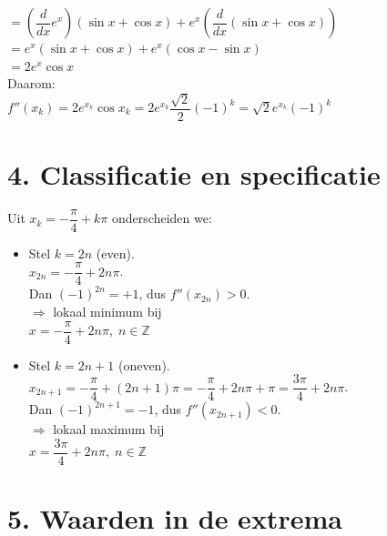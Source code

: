\documentclass[a4paper]{article}
\begin{document}
$=\left(\dfrac{d}{dx}e^x\right)(\sin x+\cos x)
+ e^x\left(\dfrac{d}{dx}(\sin x+\cos x)\right)$ \\

$=e^x(\sin x+\cos x) + e^x(\cos x-\sin x)$ \\

$=2e^x\cos x$ \\

Daarom: \\

$f''(x_k)=2e^{x_k}\cos x_k
=2e^{x_k}\dfrac{\sqrt{2}}{2}(-1)^k
=\sqrt{2}e^{x_k}(-1)^k$ \\

\section*{4. Classificatie en specificatie}

Uit $x_k=-\dfrac{\pi}{4}+k\pi$ onderscheiden we:

\begin{itemize}
\item Stel $k=2n$ (even). \\

  $x_{2n}=-\dfrac{\pi}{4}+2n\pi$. \\

  Dan $(-1)^{2n}=+1$, dus $f''(x_{2n})>0$. \\

  $\Rightarrow$ lokaal minimum bij \\

  $x=-\dfrac{\pi}{4}+2n\pi,\;n\in\mathbb{Z}$ \\

\item Stel $k=2n+1$ (oneven). \\

  $x_{2n+1}=-\dfrac{\pi}{4}+(2n+1)\pi
  =-\dfrac{\pi}{4}+2n\pi+\pi
  =\dfrac{3\pi}{4}+2n\pi$. \\

  Dan $(-1)^{2n+1}=-1$, dus $f''(x_{2n+1})<0$. \\

  $\Rightarrow$ lokaal maximum bij \\

  $x=\dfrac{3\pi}{4}+2n\pi,\;n\in\mathbb{Z}$ \\

\end{itemize}

\section*{5. Waarden in de extrema}
\end{document}
